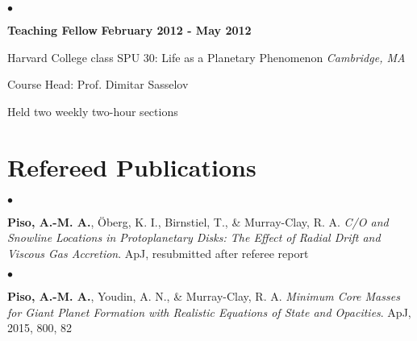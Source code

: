 \documentclass[margin,line]{res}
\newenvironment{list1}{
  \begin{list}{\ding{113}}{%
      \setlength{\itemsep}{0in}
      \setlength{\parsep}{0in} \setlength{\parskip}{0in}
      \setlength{\topsep}{0in} \setlength{\partopsep}{0in} 
      \setlength{\leftmargin}{0.17in}}}{\end{list}}
\newenvironment{list2}{
  \begin{list}{$\bullet$}{%
      \setlength{\itemsep}{0in}
      \setlength{\parsep}{0in} \setlength{\parskip}{0in}
      \setlength{\topsep}{0in} \setlength{\partopsep}{0in} 
      \setlength{\leftmargin}{0.2in}}}{\end{list}}
\begin{document}
\begin{resume}
\begin{list2}
\vspace{0.2in}

\item[] {\bf Teaching Fellow} \hfill {\bf February 2012 - May 2012}
\begin{list1}
\item[] Harvard College class SPU 30: Life as a Planetary Phenomenon \hfill \textit{Cambridge, MA}
\item[] Course Head: Prof. Dimitar Sasselov
\item[] Held two weekly two-hour sections
\end{list1}

\end{list2}

%
%

\section{\sc Refereed Publications}

\begin{list2}
\item[] {\bf Piso, A.-M. A.}, \"Oberg, K. I., Birnstiel, T., \& Murray-Clay, R. A. \textit{C/O and Snowline Locations in Protoplanetary Disks: The Effect of Radial Drift and Viscous Gas Accretion}. ApJ, resubmitted after referee report \\
\end{list2}

\begin{list2}
\item[] {\bf Piso, A.-M. A.}, Youdin, A. N., \& Murray-Clay, R. A. \textit{Minimum Core Masses for Giant Planet Formation with Realistic Equations of State and Opacities}. ApJ, 2015, 800, 82 \\
\end{list2}


\end{resume}
\end{document}
